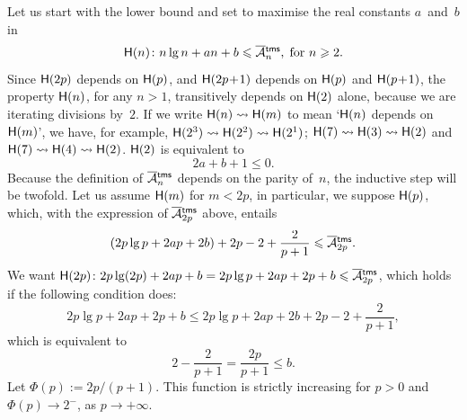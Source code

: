 Let us start with the lower bound and set to maximise the
real constants \(a\)~and~\(b\) in
\begin{equation*}
\pred{H}{n} \colon n\lg n + an + b \leqslant \OM{\fun{tms}}{n},
\; \text{for \(n \geqslant 2\).}
\end{equation*}
Since \(\textsf{H}({2p})\) depends on \(\textsf{H}({p})\), and
\(\textsf{H}({2p\!+\!1})\) depends on \(\textsf{H}({p})\) and
\(\textsf{H}({p\!+\!1})\), the property \(\textsf{H}({n})\), for any \(n>1\),
transitively depends on \(\textsf{H}({2})\) alone, because we are
iterating divisions by~\(2\). If we write \(\textsf{H}({n}) \leadsto
\textsf{H}({m})\) to mean `\(\textsf{H}({n})\) depends on \(\textsf{H}({m})\)', we
have, for example, \(\textsf{H}({2^3}) \leadsto \textsf{H}({2^2}) \leadsto
\textsf{H}({2^1})\); \(\textsf{H}({7}) \leadsto \textsf{H}({3}) \leadsto
\textsf{H}({2})\) and \(\textsf{H}({7}) \leadsto \textsf{H}({4}) \leadsto
\textsf{H}({2})\). \(\textsf{H}({2})\) is equivalent to
\begin{equation}
2a + b + 1 \leqslant 0.
\label{ineq:base_lower_Atms}
\end{equation}
Because the definition of \(\OM{\fun{tms}}{n}\) depends on the parity
of~\(n\), the inductive step will be twofold. Let us assume
\(\textsf{H}({m})\) for \(m < 2p\), in particular, we suppose
\(\textsf{H}({p})\), which, with the expression of \(\OM{\fun{tms}}{2p}\)
above, entails
\begin{equation*}
 (2p\lg p + 2ap + 2b) + 2p - 2 + \frac{2}{p+1} \leqslant \OM{\fun{tms}}{2p}.
\end{equation*}
We want \(\pred{H}{2p} \colon 2p\lg(2p) + 2ap + b
= 2p\lg p + 2ap + 2p + b \leqslant \OM{\fun{tms}}{2p}\), which holds
if the following condition does:
\begin{equation*}
2p\lg p + 2ap + 2p + b \leqslant 2p\lg p + 2ap + 2b + 2p - 2 + \frac{2}{p+1},
\end{equation*}
which is equivalent to
\begin{equation*}
2 - \frac{2}{p+1} = \frac{2p}{p+1} \leqslant b.
\end{equation*}
Let \(\Phi(p) := 2p/(p+1)\). This function is strictly increasing for
\(p > 0\) and \(\Phi(p) \to 2^{-}\), as \(p \to +\infty\).

